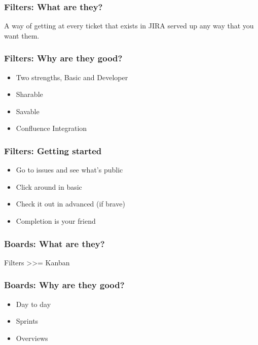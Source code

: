\documentclass{beamer}
\begin{document}
\begin{frame}[fragile]
  
  \frametitle{Filters: What are they?}

  \centering\huge{A way of getting at every ticket that exists in JIRA served up any way that you want them.}\par

\end{frame}


\begin{frame}[fragile]
  \frametitle{Filters: Why are they good?}

  \begin{itemize}
  \item{Two strengths, Basic and Developer}
  \item{Sharable}
  \item{Savable}
  \item{Confluence Integration}
  \end{itemize}

\end{frame}

\begin{frame}[fragile]
  \frametitle{Filters: Getting started}

  \begin{itemize}
  \item{Go to issues and see what's public}
  \item{Click around in basic}
  \item{Check it out in advanced (if brave)}
  \item{Completion is your friend}
  \end{itemize}

\end{frame}

\begin{frame}[fragile]
  \frametitle{Boards: What are they?}
  \centering\huge{Filters >>= Kanban}\par
\end{frame}

\begin{frame}[fragile]
  \frametitle{Boards: Why are they good?}

  \begin{itemize}
  \item{Day to day}
  \item{Sprints}
  \item{Overviews}
  \end{itemize}
  
\end{frame}
\end{document}
